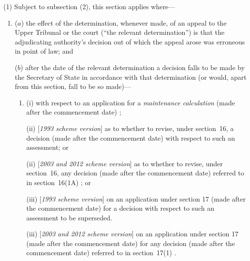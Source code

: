 \documentclass[12pt,a4paper]{article}
\begin{document}
(1) Subject to subsection (2), this section applies where—
\begin{enumerate}\item[]
($a$) the effect of the determination, whenever made, of an appeal to 
the Upper Tribunal   %
or the court (“the relevant determination”) is that the adjudicating authority’s decision out of which the appeal arose was erroneous in point of law; and

($b$) after the date of the relevant determination a decision falls to be made by the 
Secretary of State  %
in accordance with that determination (or would, apart from this section, fall to be so made)—
\begin{enumerate}\item[]
(i) with respect to an application for a 
\emph{maintenance calculation}  %
(made after the commencement date)%
;

(ii) [\emph{1993 scheme version}] as to whether to revise, under section~16, a decision (made after the commencement date) with respect to such an assessment; or

(ii) [\emph{2003 and 2012 scheme version}] as to whether to revise, under section~16, 
any decision (made after the commencement date) referred to in section~16(1A)%
; or

(iii) [\emph{1993 scheme version}] on an application under section 17 (made after the commencement date) for a decision with respect to such an assessment to be superseded.

(iii) [\emph{2003 and 2012 scheme version}] on an application under section 17 (made after the commencement date) for 
any decision (made after the commencement date) referred to in section~17(1)%
.
\end{enumerate}
\end{enumerate}
\end{document}
